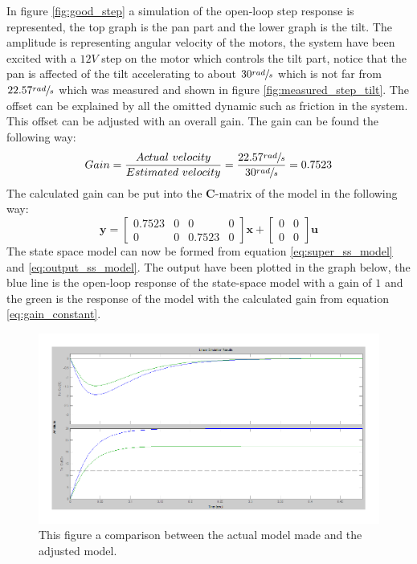 In figure \ref{fig:good_step} a simulation of the open-loop step response is represented, the top graph is the pan part and the lower graph is the tilt. The amplitude is representing angular velocity of the motors, the system have been excited with a $12V$ step on the motor which controls the tilt part, notice that the pan is affected of the tilt accelerating to about $30\sfrac{rad}{s}$ which is not far from $22.57\sfrac{rad}{s}$ which was measured and shown in figure \ref{fig:measured_step_tilt}. The offset can be explained by all the omitted dynamic such as friction in the system. This offset can be adjusted with an overall gain. The gain can be found the following way:
\begin{equation}
	Gain = \frac{Actual\ velocity}{Estimated\ velocity} = \frac{22.57\sfrac{rad}{s}}{30\sfrac{rad}{s}} = 0.7523\label{eq:gain_constant}
\end{equation}
The calculated gain can be put into the \textbf{C}-matrix of the model in the following way:
\begin{equation}
 \textbf{y} =
 \begin{bmatrix}
   0.7523 & 0 & 0 & 0\\
   0 & 0 & 0.7523 & 0
 \end{bmatrix}
 \textbf{x} +
 \begin{bmatrix}
   0 & 0\\
   0 & 0
 \end{bmatrix}
 \textbf{u}\label{eq:output_ss_model}
\end{equation}
The state space model can now be formed from equation \ref{eq:super_ss_model} and \ref{eq:output_ss_model}. The output have been plotted in the graph below, the blue line is the open-loop response of the state-space model with a gain of $1$ and the green is the response of the model with the calculated gain from equation \ref{eq:gain_constant}.
\begin{figure}[htb]
	\begin{center}
	\includegraphics[scale=1,trim=0 0 0 0]{graphics/ZoomOpenLoop.pdf} %
	\caption{This figure a comparison between the actual model made and the adjusted model.}
	\label{fig:zoom_step}			%
	\end{center}
\end{figure}
